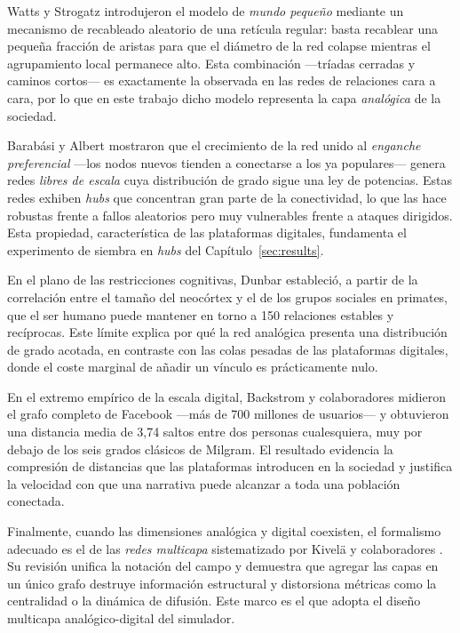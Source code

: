 \documentclass[12pt]{extarticle}
\numberwithin{equation}{section}
\begin{document}
\begin{refsection}
Watts y Strogatz \cite{WattsStrogatz1998} introdujeron el modelo de \emph{mundo peque\~no} mediante un mecanismo de recableado aleatorio de una ret\'icula regular: basta recablear una peque\~na fracci\'on de aristas para que el di\'ametro de la red colapse mientras el agrupamiento local permanece alto. Esta combinaci\'on —tr\'iadas cerradas y caminos cortos— es exactamente la observada en las redes de relaciones cara a cara, por lo que en este trabajo dicho modelo representa la capa \emph{anal\'ogica} de la sociedad.

Barab\'asi y Albert \cite{BarabasiAlbert1999} mostraron que el crecimiento de la red unido al \emph{enganche preferencial} —los nodos nuevos tienden a conectarse a los ya populares— genera redes \emph{libres de escala} cuya distribuci\'on de grado sigue una ley de potencias. Estas redes exhiben \emph{hubs} que concentran gran parte de la conectividad, lo que las hace robustas frente a fallos aleatorios pero muy vulnerables frente a ataques dirigidos. Esta propiedad, caracter\'istica de las plataformas digitales, fundamenta el experimento de siembra en \emph{hubs} del Cap\'itulo~\ref{sec:results}.

En el plano de las restricciones cognitivas, Dunbar \cite{Dunbar1992} estableci\'o, a partir de la correlaci\'on entre el tama\~no del neoc\'ortex y el de los grupos sociales en primates, que el ser humano puede mantener en torno a 150 relaciones estables y rec\'iprocas. Este l\'imite explica por qu\'e la red anal\'ogica presenta una distribuci\'on de grado acotada, en contraste con las colas pesadas de las plataformas digitales, donde el coste marginal de a\~nadir un v\'inculo es pr\'acticamente nulo.

En el extremo emp\'irico de la escala digital, Backstrom y colaboradores \cite{Backstrom2012} midieron el grafo completo de Facebook —m\'as de 700 millones de usuarios— y obtuvieron una distancia media de 3,74 saltos entre dos personas cualesquiera, muy por debajo de los seis grados cl\'asicos de Milgram. El resultado evidencia la compresi\'on de distancias que las plataformas introducen en la sociedad y justifica la velocidad con que una narrativa puede alcanzar a toda una poblaci\'on conectada.

Finalmente, cuando las dimensiones anal\'ogica y digital coexisten, el formalismo adecuado es el de las \emph{redes multicapa} sistematizado por Kivel\"a y colaboradores \cite{Kivela2014}. Su revisi\'on unifica la notaci\'on del campo y demuestra que agregar las capas en un \'unico grafo destruye informaci\'on estructural y distorsiona m\'etricas como la centralidad o la din\'amica de difusi\'on. Este marco es el que adopta el dise\~no multicapa anal\'ogico-digital del simulador.


\end{refsection}
\end{document}
